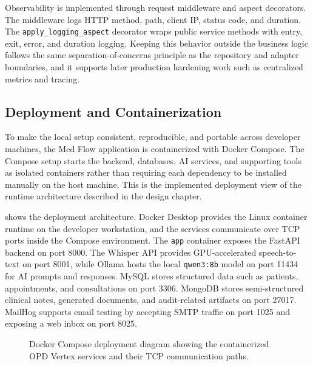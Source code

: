 Observability is implemented through request middleware and aspect decorators. The middleware logs HTTP method, path, client IP, status code, and duration. The \texttt{apply\_logging\_aspect} decorator wraps public service methods with entry, exit, error, and duration logging. Keeping this behavior outside the business logic follows the same separation-of-concerns principle as the repository and adapter boundaries, and it supports later production hardening work such as centralized metrics and tracing.

\subsection{Deployment and Containerization}
\label{subsec:deployment-containerization}

To make the local setup consistent, reproducible, and portable across developer machines, the Med Flow application is containerized with Docker Compose. The Compose setup starts the backend, databases, AI services, and supporting tools as isolated containers rather than requiring each dependency to be installed manually on the host machine. This is the implemented deployment view of the runtime architecture described in the design chapter.

 shows the deployment architecture. Docker Desktop provides the Linux container runtime on the developer workstation, and the services communicate over TCP ports inside the Compose environment. The \texttt{app} container exposes the FastAPI backend on port 8000. The Whisper API provides GPU-accelerated speech-to-text on port 8001, while Ollama hosts the local \texttt{qwen3:8b} model on port 11434 for AI prompts and responses. MySQL stores structured data such as patients, appointments, and consultations on port 3306. MongoDB stores semi-structured clinical notes, generated documents, and audit-related artifacts on port 27017. MailHog supports email testing by accepting SMTP traffic on port 1025 and exposing a web inbox on port 8025.

\begin{figure}[htbp]
\centering
{}
\caption{Docker Compose deployment diagram showing the containerized OPD Vertex services and their TCP communication paths.}
\label{fig:deployment-containerization}
\end{figure}
\FloatBarrier